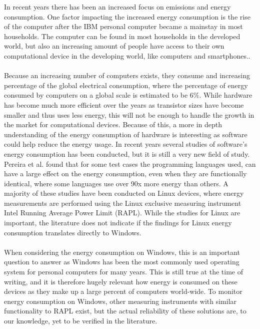
In recent years there has been an increased focus on emissions and energy consumption. One factor impacting the increased energy consumption is the rise of the computer after the IBM personal computer became a mainstay in most households. The computer can be found in most households in the developed world, but also an increasing amount of people have access to their own computational device in the developing world, like computers and smartphones.\cite{DevelopedWorldPC}. 

\paragraph*{}
Because an increasing number of computers exists, they consume and increasing percentage of the global electrical consumption, where the percentage of energy consumed by computers on a global scale is estimated to be 6\%\cite{somavat2011energy}. While hardware has become much more efficient over the years as transistor sizes have become smaller and thus uses less energy, this will not be enough to handle the growth in the market for computational devices\cite{procaccianti2011profiling}. Because of this, a more in depth understanding of the energy consumption of hardware is interesting as software could help reduce the energy usage\cite{somavat2011energy}. In recent years several studies of software's energy consumption has been conducted, but it is still a very new field of study. Pereira et al.\cite{Pereira2017} found that for some test cases the programming languages used, can have a large effect on the energy consumption, even when they are functionally identical, where some languages use over 90x more energy than others. A majority of these studies have been conducted on Linux devices, where energy measurements are performed using the Linux exclusive measuring instrument Intel Running Average Power Limit (RAPL). While the studies for Linux are important, the literature does not indicate if the findings for Linux energy consumption translates directly to Windows\cite{Pereira2017}. 

\paragraph*{}
When considering the energy consumption on Windows, this is an important question to answer as Windows has been the most commonly used operating system for personal computers for many years. This is still true at the time of writing, and it is therefore hugely relevant how energy is consumed on these devices as they make up a large percent of computers world-wide\cite{OSShare}. To monitor energy consumption on Windows, other measuring instruments with similar functionality to RAPL exist, but the actual reliability of these solutions are, to our knowledge, yet to be verified in the literature.

